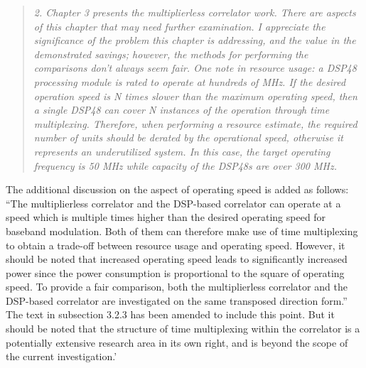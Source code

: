 \documentclass{article}
\begin{document}
\begin{quote}
\emph{2. Chapter 3 presents the multiplierless correlator work. There are aspects of this chapter that may need further examination. I appreciate the significance of the problem this chapter is addressing, and the value in the demonstrated savings; however, the methods for performing the comparisons don't always seem fair.
One note in resource usage: a DSP48 processing module is rated to operate at hundreds of MHz. If the desired operation speed is N times slower than the maximum operating speed, then a single DSP48 can cover N instances of the operation through time multiplexing. Therefore, when performing a resource estimate, the required number of units should be derated by the operational speed, otherwise it represents an underutilized system. In this case, the target operating frequency is 50 MHz while capacity of the DSP48s are over 300 MHz.	}
\end{quote}
The additional discussion on the aspect of operating speed is added as follows:  
``The multiplierless correlator and the DSP-based correlator can operate at a speed which is multiple times higher than the desired operating speed for baseband modulation. Both of them can therefore make use of time multiplexing to obtain a trade-off between resource usage and operating speed. However, it should be noted that increased operating speed leads to significantly increased power since the power consumption is proportional to the square of operating speed. To provide a fair comparison, both the multiplierless correlator and the DSP-based correlator are investigated on the same transposed direction form.''
The text in subsection 3.2.3 has been amended to include this point.  But it should be noted that the structure of time multiplexing within the correlator is a potentially extensive research area in its own right, and is beyond the scope of the current investigation.'
\end{document}
